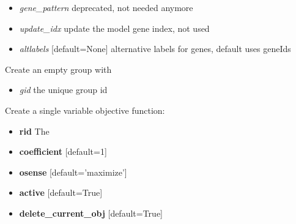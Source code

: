 \documentclass[a4paper,11pt,english]{sphinxmanual}
\begin{document}
\begin{fulllineitems}
\begin{fulllineitems}
\begin{itemize}
\item {} 
\emph{gene\_pattern} deprecated, not needed anymore

\item {} 
\emph{update\_idx} update the model gene index, not used

\item {} 
\emph{altlabels} {[}default=None{]} alternative labels for genes, default uses geneIds

\end{itemize}

\end{fulllineitems}


\begin{fulllineitems}
\label{modules_doc:cbmpy.CBModel.Model.createGroup}
Create an empty group with
\begin{itemize}
\item {} 
\emph{gid} the unique group id

\end{itemize}

\end{fulllineitems}


\begin{fulllineitems}
\label{modules_doc:cbmpy.CBModel.Model.createObjectiveFunction}
Create a single variable objective function:
\begin{itemize}
\item {} 
\textbf{rid} The

\item {} 
\textbf{coefficient} {[}default=1{]}

\item {} 
\textbf{osense} {[}default='maximize'{]}

\item {} 
\textbf{active} {[}default=True{]}

\item {} 
\textbf{delete\_current\_obj} {[}default=True{]}

\end{itemize}


\end{fulllineitems}
\end{fulllineitems}
\end{document}

